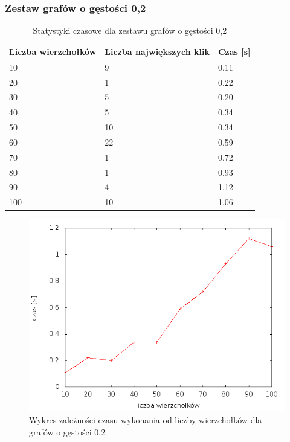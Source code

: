 \documentclass[12pt, a4paper]{article}
\begin{document}
\subsubsection*{Zestaw grafów o gęstości 0,2}
\begin{table}[H]
\caption{Statystyki czasowe dla zestawu grafów o gęstości 0,2}
\begin{center}
    \begin{tabular}{|l|l|l|}
    \hline
    Liczba wierzchołków & Liczba największych klik & Czas [s] \\ \hline
    10 & 9 & 0.11 \\ \hline
    20 & 1 & 0.22 \\ \hline
    30 & 5 & 0.20 \\ \hline
    40 & 5 & 0.34 \\ \hline
    50 & 10 & 0.34 \\ \hline
    60 & 22 & 0.59 \\ \hline
    70 & 1 & 0.72 \\ \hline
    80 & 1 & 0.93 \\ \hline
    90 & 4 & 1.12 \\ \hline
    100 & 10 & 1.06 \\ \hline
    \end{tabular}
\end{center}
\end{table}

\begin{figure}[h]
    \begin{center}
	\includegraphics[scale=0.5]{../experiment_1/img/den/den_02.png}
	\caption{Wykres zależności czasu wykonania od liczby wierzchołków dla grafów o gęstości 0,2}
    \end{center}
\end{figure}
\end{document}
